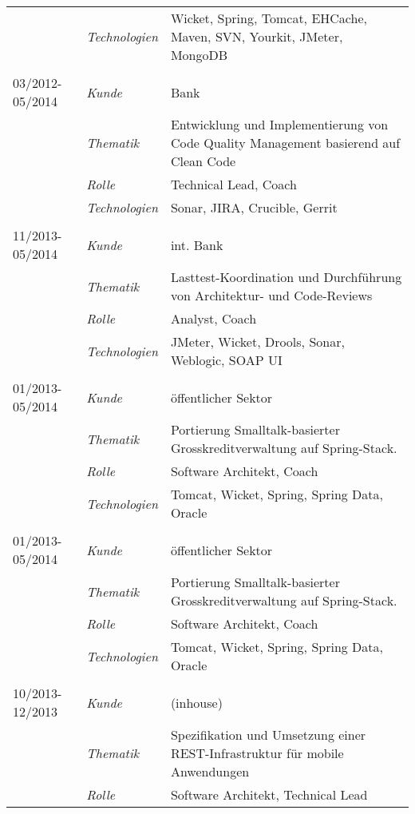 \begin{longtable}{@{}>{}p{4cm}>{\itshape}p{2cm}>{}p{9cm}}
\nopagebreak		& Technologien	& Wicket, Spring, Tomcat, EHCache, Maven, SVN, Yourkit, JMeter, MongoDB\\
\\
03/2012-05/2014     & Kunde         & Bank\\
\nopagebreak        & Thematik      & Entwicklung und Implementierung von Code Quality Management basierend auf Clean Code\\
\nopagebreak        & Rolle         & Technical Lead, Coach\\
\nopagebreak        & Technologien  & Sonar, JIRA, Crucible, Gerrit\\
\\
11/2013-05/2014     & Kunde         & int. Bank\\
\nopagebreak        & Thematik      & Lasttest-Koordination und Durchführung von Architektur- und Code-Reviews\\
\nopagebreak        & Rolle         & Analyst, Coach\\
\nopagebreak        & Technologien  & JMeter, Wicket, Drools, Sonar, Weblogic, SOAP UI\\
\\
01/2013-05/2014     & Kunde         & öffentlicher Sektor\\
\nopagebreak        & Thematik      & Portierung Smalltalk-basierter Grosskreditverwaltung auf Spring-Stack. \\
\nopagebreak        & Rolle         & Software Architekt, Coach\\
\nopagebreak        & Technologien  & Tomcat, Wicket, Spring, Spring Data, Oracle\\
\\
01/2013-05/2014     & Kunde         & öffentlicher Sektor\\
\nopagebreak        & Thematik      & Portierung Smalltalk-basierter Grosskreditverwaltung auf Spring-Stack. \\
\nopagebreak        & Rolle         & Software Architekt, Coach\\
\nopagebreak        & Technologien  & Tomcat, Wicket, Spring, Spring Data, Oracle\\
\\
10/2013-12/2013     & Kunde         & (inhouse)\\
\nopagebreak        & Thematik      & Spezifikation und Umsetzung einer REST-Infrastruktur für mobile Anwendungen\\
\nopagebreak        & Rolle         & Software Architekt, Technical Lead\\

\end{longtable}
